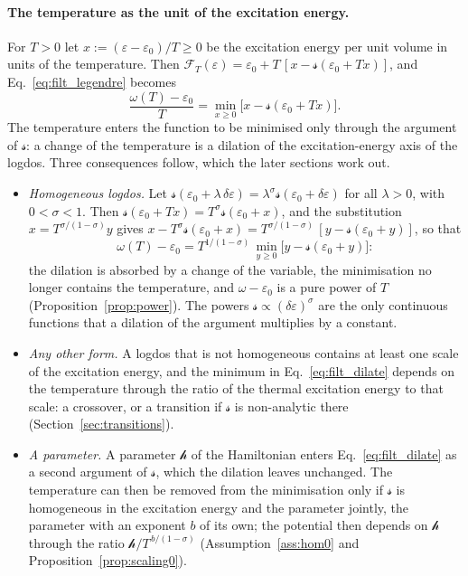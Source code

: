 \documentclass[10pt,a4paper]{article}
\theoremstyle{plain}
\newcommand{\lndos}{{logdos}}  %
\newcommand{\hfield}{\mathscr{h}}  %
\newcommand{\Fen}[1][T]{\mathscr{F}_{#1}}  %
\newcommand{\lds}{\mathscr{s}}  %
\begin{document}
\paragraph{The temperature as the unit of the excitation energy.} For
$T>0$ let $x:=(\varepsilon-\varepsilon_0)/T\ge0$ be the excitation energy
per unit volume in units of the temperature. Then
$\Fen(\varepsilon)=\varepsilon_0+T\,[x-\lds(\varepsilon_0+Tx)]$, and
Eq.~\eqref{eq:filt_legendre} becomes
\begin{equation}\label{eq:filt_dilate}
  \frac{\omega(T)-\varepsilon_0}{T}=\min_{x\ge0}\big[x-\lds(\varepsilon_0+Tx)\big] .
\end{equation}
The temperature enters the function to be minimised only through the
argument of $\lds$: a change of the temperature is a dilation of the
excitation-energy axis of the \lndos{}. Three consequences follow, which
the later sections work out.
\begin{itemize}\setlength{\itemsep}{0pt}
\item \emph{Homogeneous \lndos.} Let
  $\lds(\varepsilon_0+\lambda\,\delta\varepsilon)=\lambda^{\sigma}\lds(\varepsilon_0+\delta\varepsilon)$
  for all $\lambda>0$, with $0<\sigma<1$. Then
  $\lds(\varepsilon_0+Tx)=T^{\sigma}\lds(\varepsilon_0+x)$, and the
  substitution $x=T^{\sigma/(1-\sigma)}y$ gives
  $x-T^{\sigma}\lds(\varepsilon_0+x)=T^{\sigma/(1-\sigma)}\,[y-\lds(\varepsilon_0+y)]$,
  so that
  \[
    \omega(T)-\varepsilon_0=T^{1/(1-\sigma)}\,\min_{y\ge0}\big[y-\lds(\varepsilon_0+y)\big] :
  \]
  the dilation is absorbed by a change of the variable, the minimisation no
  longer contains the temperature, and $\omega-\varepsilon_0$ is a pure
  power of $T$ (Proposition~\ref{prop:power}). The powers
  $\lds\propto(\delta\varepsilon)^{\sigma}$ are the only continuous functions
  that a dilation of the argument multiplies by a constant.
\item \emph{Any other form.} A \lndos{} that is not homogeneous contains at
  least one scale of the excitation energy, and the minimum in
  Eq.~\eqref{eq:filt_dilate} depends on the temperature through the ratio
  of the thermal excitation energy to that scale: a crossover, or a
  transition if $\lds$ is non-analytic there
  (Section~\ref{sec:transitions}).
\item \emph{A parameter.} A parameter $\hfield$ of the Hamiltonian enters
  Eq.~\eqref{eq:filt_dilate} as a second argument of $\lds$, which the
  dilation leaves unchanged. The temperature can then be removed from the
  minimisation only if $\lds$ is homogeneous in the excitation energy and the
  parameter jointly, the parameter with an exponent $b$ of its own; the
  potential then depends on $\hfield$ through the ratio
  $\hfield/T^{\,b/(1-\sigma)}$ (Assumption~\ref{ass:hom0} and
  Proposition~\ref{prop:scaling0}).
\end{itemize}
\end{document}

